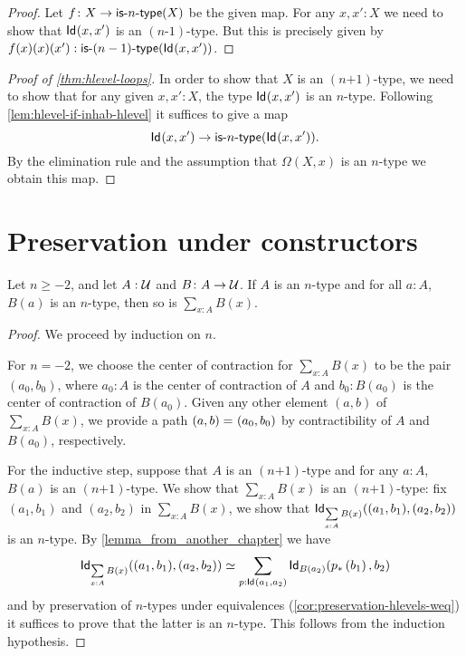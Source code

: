 \begin{proof}
  Let $f \colon X \to \istype{n}(X)$ be the given map. For any $x, x' : X$ we need to show that
     $\idtype{x}{x'}$ is an $(n \mbox{-} 1)$-type. But this is precisely given by
    $f(x)(x)(x') : \istype{(n-1)}(\idtype{x}{x'}) $.
\end{proof}


\begin{proof}[Proof of \autoref{thm:hlevel-loops}]
 In order to show that $X$ is an $(n\mbox{+}1)$-type, we need to show that for any given $x, x' : X$,
   the type $\idtype{x}{x'}$ is an $n$-type.
  Following \autoref{lem:hlevel-if-inhab-hlevel} it suffices to give a map
   \[ \idtype{x}{x'} \to \istype{n}(\idtype{x}{x'})  .\]
  By the elimination rule and the assumption that $\Omega(X, x)$ is an $n$-type we obtain this map.
\end{proof}

\section{Preservation under constructors}

\begin{thm}
 Let $n \geq -2$, and let $A : \type$ and $B \colon A \to \type$.
 If $A$ is an $n$-type and for all $a : A$, $B(a)$ is an $n$-type, then so is $\sum\limits_{x : A} B(x)$.
\end{thm}

\begin{proof}
 We proceed by induction on $n$.

 For $n = -2$, we choose the center of contraction for $\sum\limits_{x : A} B(x)$ to be the pair
       $(a_0, b_0)$, where $a_0 : A$ is the center of contraction of $A$ and $b_0 : B(a_0)$ is the center of contraction of $B(a_0)$.
       Given any other element $(a,b)$ of $\sum\limits_{x : A} B(x)$, we provide a path $\id{(a, b)}{(a_0,b_0)}$
       by contractibility of $A$ and $B(a_0)$, respectively.

 For the inductive step, suppose that $A$ is an $(n\mbox{+}1)$-type and
         for any $a : A$, $B(a)$ is an $(n \mbox{+} 1)$-type. We show that $\sum\limits_{x : A} B(x)$ is an $(n \mbox{+} 1)$-type:
      fix $(a_1, b_1)$ and $(a_2,b_2)$ in $\sum\limits_{x : A} B(x)$,
     we show that $\idtype[\sum\limits_{x : A} B(x)]{(a_1, b_1)}{(a_2,b_2)}$ is an $n$-type.
      By \autoref{lemma_from_another_chapter} we have
      \[ \eqv{\idtype[\sum\limits_{x : A} B(x)]{(a_1, b_1)}{(a_2,b_2)}}{\sum_{p : \idtype{a_1}{a_2}} \idtype[B(a_2)]{\trans{p}{b_1}}{b_2}} \]
   and by preservation of $n$-types under equivalences (\autoref{cor:preservation-hlevels-weq})
   it suffices to prove that the latter is an $n$-type. This follows from the
   induction hypothesis.
\end{proof}


